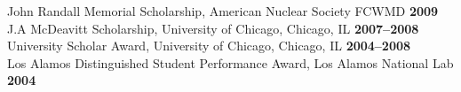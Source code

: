 \documentclass[margin,line]{resume}
\begin{document}
\begin{resume}
                John Randall Memorial Scholarship, American Nuclear Society FCWMD                   \hfill \textbf{2009}\vspace{.5mm}\\%
                J.A  McDeavitt Scholarship, University of Chicago, Chicago, IL                 \hfill\textbf{2007--2008}\vspace{.5mm}\\%
                University Scholar Award, University of Chicago, Chicago, IL                   \hfill\textbf{2004--2008}\vspace{.5mm}\\%
                Los Alamos Distinguished Student Performance Award, Los Alamos National Lab                         \hfill\textbf{2004}%

\end{resume}
\end{document}
